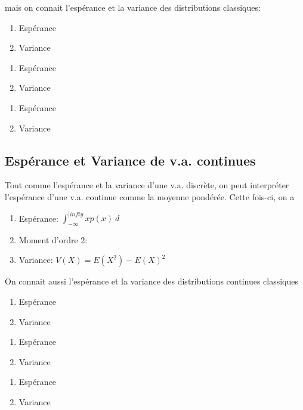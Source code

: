 \documentclass{article}
\begin{document}
mais on connait l'espérance et la variance des distributions classiques:
\begin{enumerate}
	\begin{enumerate}[Binomiale]
	    \item Espérance
	    \item Variance
	\end{enumerate}
	\begin{enumerate}[Poisson]
	    \item Espérance
	    \item Variance
	\end{enumerate}
	\begin{enumerate}[Géométrique]
	    \item Espérance
	    \item Variance
	\end{enumerate}
\end{enumerate}

\subsection{Espérance et Variance de v.a. continues}

Tout comme l'espérance et la variance d'une v.a. discrète, on peut
interpréter l'espérance d'une v.a. continue comme la moyenne pondérée.
Cette fois-ci, on a
\begin{enumerate}
    \item Espérance: $ \int_{{-\infty}}^{{]infty}} {x p(x)} \: d{} {}$
    \item Moment d'ordre 2:
    \item Variance: $V(X) = E(X^2) - E(X)^2 $
\end{enumerate}

On connait aussi l'espérance et la variance des distributions continues
classiques

\begin{enumerate}
	\begin{enumerate}[Uniforme]
	    \item Espérance
	    \item Variance
	\end{enumerate}
	\begin{enumerate}[Exponentielle]
	    \item Espérance
	    \item Variance
	\end{enumerate}
	\begin{enumerate}[Normale]
	    \item Espérance
	    \item Variance
	\end{enumerate}
\end{enumerate}
\end{document}
